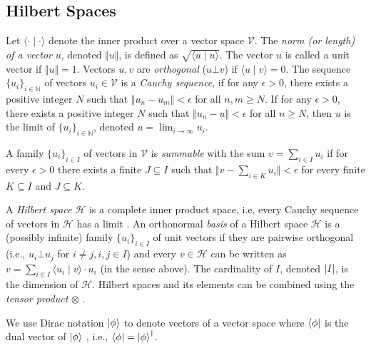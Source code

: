 \documentclass[a4paper,UKenglish,cleveref, autoref, thm-restate]{lipics-v2021}
\begin{document}
\subsection{Hilbert Spaces}
Let $\langle \cdot \mid \cdot \rangle$ denote the {inner product} over a vector space $\mathcal{V}$. The \emph{norm (or length) of a vector} $u$, denoted $\Vert u \Vert$, is defined as $\sqrt{\langle u \mid u \rangle}$. The vector $u$ is called a unit vector if $\Vert u \Vert = 1$. Vectors $u,v$ are \emph{orthogonal} ($u \bot v$) if $\langle u \mid v \rangle = 0$. The sequence $\{u_i\}_{i \in \mathbb{N}}$ of vectors $u_i \in \mathcal{V}$  is a \emph{Cauchy sequence}, if for any $\epsilon>0$, there exists a positive integer $N$ such that $\Vert u_n - u_m \Vert < \epsilon$ for all $n,m\geq N$. If for any $\epsilon >0$, there exists a positive integer $N$ such that $\Vert u_n - u \Vert < \epsilon$ for all $n \geq N$, then $u$ is the limit of $\{u_i\}_{i \in \mathbb{N}}$, denoted $u = \lim_{i \to \infty} u_i$.

A family $\{u_i\}_{i \in I}$ of vectors in $\mathcal{V}$ is \emph{summable} with the sum $v = \sum_{i \in I}u_i$ if for every $\epsilon>0$ there exists a finite $J \subseteq I$ such that $\Vert v - \sum_{i \in K} u_i \Vert < \epsilon$ for every finite $K \subseteq I$ and $J \subseteq K$.

A \emph{Hilbert space} $\mathcal{H}$ is a complete inner product space, i.e, every Cauchy sequence of vectors in $\mathcal{H}$ has a limit \cite{floydHoareLogic}.
An orthonormal \emph{basis} of a Hilbert space $\mathcal{H}$ is a (possibly infinite) family $\{u_i\}_{i \in I}$ of unit vectors if they are pairwise orthogonal (i.e., $u_i \bot u_j$ for $i\neq j, i,j\in I$) and every $v\in \mathcal{H}$ can be written as $v = \sum_{i \in I} \langle u_i \mid v\rangle \cdot u_i$ (in the sense above). The cardinality of $I$, denoted $\abs{I}$, is the dimension of $\mathcal{H}$. Hilbert spaces and its elements can be combined using the \emph{tensor product} $\otimes$ \cite[Def. IV.1.2]{takesaki1979theory}.

We use Dirac notation $\ket{\phi}$ to denote vectors of a vector space where $\bra{\phi}$ is the dual vector of $\ket{\phi}$ \cite{Dirac}, i.e., $\bra{\phi}=\ket{\phi}^\dagger$.
\end{document}
